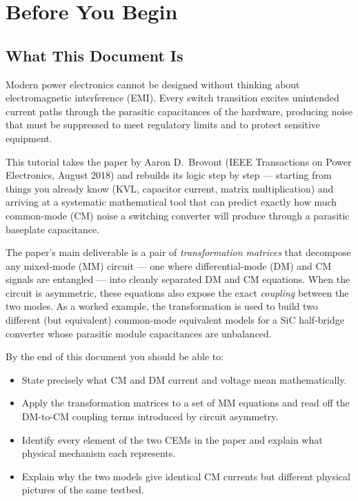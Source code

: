 \setcounter{section}{-1}
\section{Before You Begin}

\subsection{What This Document Is}

Modern power electronics cannot be designed without thinking about
electromagnetic interference (EMI).  Every switch transition excites
unintended current paths through the parasitic capacitances of the
hardware, producing noise that must be suppressed to meet regulatory
limits and to protect sensitive equipment.

This tutorial takes the paper by Aaron D.\ Brovont (IEEE Transactions
on Power Electronics, August 2018) and rebuilds its logic step by
step — starting from things you already know (KVL, capacitor current,
matrix multiplication) and arriving at a systematic mathematical tool
that can predict exactly how much common-mode (CM) noise a switching
converter will produce through a parasitic baseplate capacitance.

The paper's main deliverable is a pair of \emph{transformation
matrices} that decompose any mixed-mode (MM) circuit — one where
differential-mode (DM) and CM signals are entangled — into cleanly
separated DM and CM equations.  When the circuit is asymmetric, these
equations also expose the exact \emph{coupling} between the two modes.
As a worked example, the transformation is used to build two different
(but equivalent) common-mode equivalent models for a SiC half-bridge
converter whose parasitic module capacitances are unbalanced.

By the end of this document you should be able to:
\begin{itemize}
    \item State precisely what CM and DM current and voltage mean
          mathematically.
    \item Apply the transformation matrices to a set of MM equations
          and read off the DM-to-CM coupling terms introduced by
          circuit asymmetry.
    \item Identify every element of the two CEMs in the paper and
          explain what physical mechanism each represents.
    \item Explain why the two models give identical CM currents but
          different physical pictures of the same testbed.
\end{itemize}

